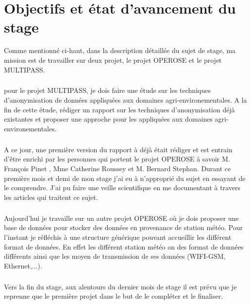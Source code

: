 \chapter{Objectifs et état d'avancement du stage}
Comme mentionné ci-haut, dans la description détaillée du sujet de stage, ma mission est de travailler sur deux projet, le projet OPEROSE et le projet MULTIPASS. 

\paragraph{}
pour le projet MULTIPASS, je dois faire une étude sur les techniques d'anonymisation de données appliquées aux domaines agri-environementales. A la fin de cette étude, rédiger un rapport sur les techniques d'anonymisation déjà existantes et proposer une approche pour les appliquées aux domaines agri-environementales.
\paragraph{}
A ce jour, une première version du rapport à déjà était rédiger et est entrain d'être enrichi par les personnes qui portent le projet OPEROSE à savoir M. François Pinet , Mme Catherine Roussey  et M. Bernard Stephan. Durant ce première mois et demi de mon stage j'ai eu à n'approprié du sujet en essayant de le comprendre. J'ai pu faire une veille scientifique en me documentant à travers les articles qui traitent ce sujet. 

\paragraph{}
Aujourd'hui je travaille sur un autre projet OPEROSE où je dois proposer une base de données pour stocker des données en provenance de station météo. Pour l'instant je réfléchis à une structure générique pouvant accueillir les différent format de données. En effet les différent station météo on des format de données différents ainsi que les moyen de transmission de ses données (WIFI-GSM, Ethernet,...).


\paragraph{}
Vers la fin du stage, aux alentours du dernier mois de stage il est prévu que je reprenne que le première projet dans le but de le compléter et le finaliser.

